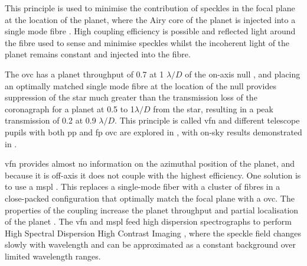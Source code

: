 \documentclass[letterpaper]{ar-1col}
\newcommand{\ld}{$\lambda/D$}
\begin{document}
This principle is used to minimise the contribution of speckles in the focal plane at the location of the planet, where the Airy core of the planet is injected into a single mode fibre \citep{Mawet17}.
%
High coupling efficiency is possible \citep[with a theoretical maximum of 81\% for an Airy core into the Gaussian HE$_{11}$ mode; ][]{shaklan1988coupling} and reflected light around the fibre used to sense and minimise speckles whilst the incoherent light of the planet remains constant and injected into the fibre. 

The \ac{ovc} has a planet throughput of 0.7 at 1 \ld{} of the on-axis null \citep{Mawet05b}, and placing an optimally matched single mode fibre at the location of the null provides suppression of the star much greater than the transmission loss of the coronagraph for a planet at 0.5 to 1\ld{} from the star, resulting in a peak transmission of 0.2 at 0.9 \ld{}.
%
This principle is called \acl{vfn} \citep[\acs{vfn}; ][]{Ruane18} and different telescope pupils with both \ac{pp} and \ac{fp} \ac{ovc} are explored in \citet{Ruane19}, with on-sky results demonstrated in \citet{Echeverri24}.

\ac{vfn} provides almost no information on the azimuthal position of the planet, and because it is off-axis it does not couple with the highest efficiency.
%
One solution is to use a \acl{mspl} \citep[\acs{mspl}; ][]{LeonSaval13}.
%
This replaces a single-mode fiber with a cluster of fibres in a close-packed configuration that optimally match the focal plane with a \ac{ovc}.
%
The properties of the coupling increase the planet throughput and partial localisation of the planet \citep{Xin22}.
%
The \ac{vfn} and \ac{mspl} feed high dispersion spectrographs to perform High Spectral Dispersion High Contrast Imaging \citep[][ and this Review]{Snellen15}, where the speckle field changes slowly with wavelength and can be approximated as a constant background over limited wavelength ranges.
\end{document}
